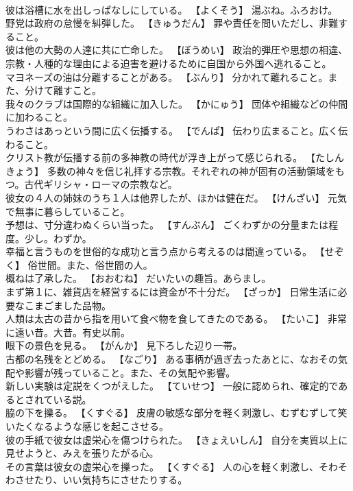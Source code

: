 \documentclass[8pt]{extreport}
\begin{document}
\begin{CJK}{UTF8}{min}
\\	彼は浴槽に水を出しっぱなしにしている。	【よくそう】 湯ぶね。ふろおけ。
\\	野党は政府の怠慢を糾弾した。	【きゅうだん】 罪や責任を問いただし、非難すること。
\\	彼は他の大勢の人達に共に亡命した。	【ぼうめい】 政治的弾圧や思想の相違、宗教・人種的な理由による迫害を避けるために自国から外国へ逃れること。
\\	マヨネーズの油は分離することがある。	【ぶんり】 分かれて離れること。また、分けて離すこと。
\\	我々のクラブは国際的な組織に加入した。	【かにゅう】 団体や組織などの仲間に加わること。
\\	うわさはあっという間に広く伝播する。	【でんぱ】 伝わり広まること。広く伝わること。
\\	クリスト教が伝播する前の多神教の時代が浮き上がって感じられる。	【たしんきょう】 多数の神々を信じ礼拝する宗教。それぞれの神が固有の活動領域をもつ。古代ギリシャ・ローマの宗教など。
\\	彼女の４人の姉妹のうち１人は他界したが、ほかは健在だ。	【けんざい】 元気で無事に暮らしていること。
\\	予想は、寸分違わぬくらい当った。	【すんぶん】 ごくわずかの分量または程度。少し。わずか。
\\	幸福と言うものを世俗的な成功と言う点から考えるのは間違っている。	【せぞく】 俗世間。また、俗世間の人。
\\	概ねは了承した。	【おおむね】 だいたいの趣旨。あらまし。
\\	まず第１に、雑貨店を経営するには資金が不十分だ。	【ざっか】 日常生活に必要なこまごました品物。
\\	人類は太古の昔から指を用いて食べ物を食してきたのである。	【たいこ】 非常に遠い昔。大昔。有史以前。
\\	眼下の景色を見る。	【がんか】 見下ろした辺り一帯。
\\	古都の名残をとどめる。	【なごり】 ある事柄が過ぎ去ったあとに、なおその気配や影響が残っていること。また、その気配や影響。
\\	新しい実験は定説をくつがえした。	【ていせつ】 一般に認められ、確定的であるとされている説。
\\	脇の下を擽る。	【くすぐる】 皮膚の敏感な部分を軽く刺激し、むずむずして笑いたくなるような感じを起こさせる。
\\	彼の手紙で彼女は虚栄心を傷つけられた。	【きょえいしん】 自分を実質以上に見せようと、みえを張りたがる心。
\\	その言葉は彼女の虚栄心を擽った。	【くすぐる】 人の心を軽く刺激し、そわそわさせたり、いい気持ちにさせたりする。

\end{CJK}
\end{document}
